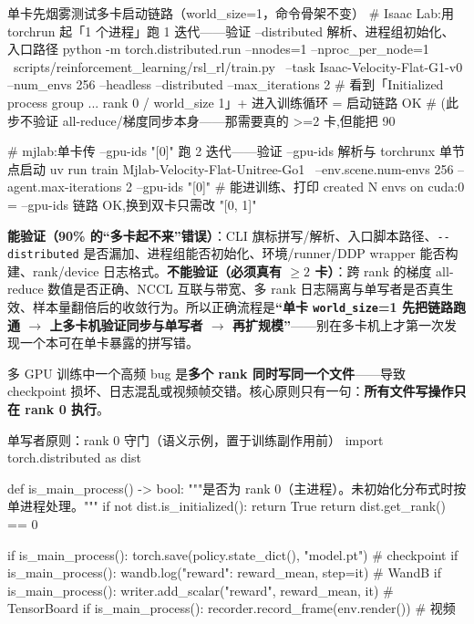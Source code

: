 \begin{codebox}[bash]{单卡先烟雾测试多卡启动链路（world\_size=1，命令骨架不变）}
# Isaac Lab:用 torchrun 起「1 个进程」跑 1 迭代——验证 --distributed 解析、进程组初始化、入口路径
python -m torch.distributed.run --nnodes=1 --nproc_per_node=1 \
    scripts/reinforcement_learning/rsl_rl/train.py \
    --task Isaac-Velocity-Flat-G1-v0 --num_envs 256 --headless --distributed --max_iterations 2
#   看到「Initialized process group ... rank 0 / world_size 1」+ 进入训练循环 = 启动链路 OK
#   (此步不验证 all-reduce/梯度同步本身——那需要真的 >=2 卡,但能把 90%

# mjlab:单卡传 --gpu-ids "[0]" 跑 2 迭代——验证 --gpu-ids 解析与 torchrunx 单节点启动
uv run train Mjlab-Velocity-Flat-Unitree-Go1 \
    --env.scene.num-envs 256 --agent.max-iterations 2 --gpu-ids "[0]"
#   能进训练、打印 created N envs on cuda:0 = --gpu-ids 链路 OK,换到双卡只需改 "[0, 1]"
\end{codebox}

\begin{note}
\textbf{能验证（90\% 的“多卡起不来”错误）}：CLI 旗标拼写/解析、入口脚本路径、\verb|--distributed| 是否漏加、进程组能否初始化、环境/runner/DDP wrapper 能否构建、rank/device 日志格式。\textbf{不能验证（必须真有 $\ge 2$ 卡）}：跨 rank 的梯度 all-reduce 数值是否正确、NCCL 互联与带宽、多 rank 日志隔离与单写者是否真生效、样本量翻倍后的收敛行为。所以正确流程是\textbf{“单卡 \texttt{world\_size}=1 先把链路跑通 $\to$ 上多卡机验证同步与单写者 $\to$ 再扩规模”}——别在多卡机上才第一次发现一个本可在单卡暴露的拼写错。
\end{note}

多 GPU 训练中一个高频 bug 是\textbf{多个 rank 同时写同一个文件}——导致 checkpoint 损坏、日志混乱或视频帧交错。核心原则只有一句：\textbf{所有文件写操作只在 rank 0 执行}。

\begin{codebox}[Python]{单写者原则：rank 0 守门（语义示例，置于训练副作用前）}
import torch.distributed as dist

def is_main_process() -> bool:
    """是否为 rank 0（主进程）。未初始化分布式时按单进程处理。"""
    if not dist.is_initialized():
        return True
    return dist.get_rank() == 0

if is_main_process():
    torch.save(policy.state_dict(), "model.pt")      # checkpoint
if is_main_process():
    wandb.log({"reward": reward_mean}, step=it)       # WandB
if is_main_process():
    writer.add_scalar("reward", reward_mean, it)      # TensorBoard
if is_main_process():
    recorder.record_frame(env.render())               # 视频
\end{codebox}

